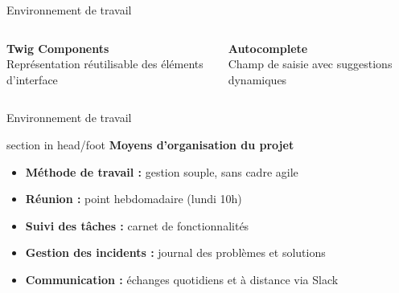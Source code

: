 \documentclass{beamer}
\begin{document}
\begin{frame}{Environnement de travail}
\begin{center}
\begin{minipage}{0.9\textwidth}
\begin{columns}[T, onlytextwidth]
      				\begin{minipage}[t][2cm][t]{\linewidth}
        					\raggedright
        					\textbf{Twig Components} \\
        					Représentation réutilisable des éléments d'interface
      				\end{minipage}
      				\vspace{0.7em}
          			\pause
      
      				\begin{minipage}[t][2cm][t]{\linewidth}
        					\raggedright
        					\textbf{Autocomplete} \\
        					Champ de saisie avec suggestions dynamiques
      				\end{minipage}
      
  			\end{columns}
		\end{minipage}
	\end{center}
	\vfill
\end{frame}

\begin{frame}[label=env]{Environnement de travail}
    \begin{beamercolorbox}[wd=\paperwidth,ht=1.5em,dp=0.5em,leftskip=0.5cm]{section in head/foot}
        \large \textbf{Moyens d'organisation du projet}
    \end{beamercolorbox}
    \vspace{0.5em}
    \begin{center}
\begin{minipage}{0.9\textwidth}
    \begin{itemize}
        \item<1-> \textbf{Méthode de travail :} gestion souple, sans cadre agile
        \item<2-> \textbf{Réunion :} point hebdomadaire (lundi 10h)
        \item<3-> \textbf{Suivi des tâches :} carnet de fonctionnalités
        \item<4-> \textbf{Gestion des incidents :} journal des problèmes et solutions
        \item<5-> \textbf{Communication :} échanges quotidiens et à distance via Slack
    \end{itemize}
\end{minipage}

    \end{center}
    \vfill
\end{frame}
\end{document}
